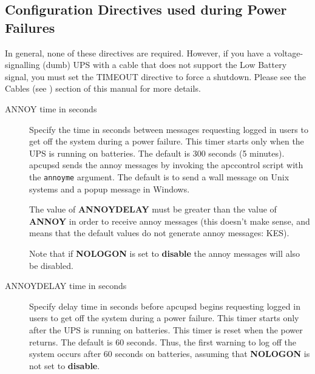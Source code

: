 {{{{{{{{{{{\begin{description}
{{This filename may also be specified at build time by using the {\tt
\verb{--{with-log-dir=} option of the {\tt ./configure} program. 
\end{description}

\label{Configuration-Directives-used-during-Power-Failures}

\subsection*{Configuration Directives used during Power Failures}

\label{index-Directives_002c-Power-fail-243}
\label{index-Power-fail-directives-244}
In general, none of these directives are required. However, if you have a
voltage-signalling (dumb) UPS with a cable that does not support the Low
Battery signal, you must set the TIMEOUT directive to force a shutdown. Please
see the Cables (see 
) section of this manual for more details.  

\begin{description}

\item [ANNOY \lt{}time in seconds\gt{}]
   Specify the time in seconds between messages requesting logged in users to get
off the system during a power failure. This timer starts only when the UPS is
running on batteries. The default is 300 seconds (5 minutes). apcupsd sends
the annoy messages by invoking the apccontrol script with the {\tt annoyme}
argument. The default is to send a wall message on Unix systems and a popup
message in Windows.  

The value of {\bf ANNOYDELAY} must be greater than the value of {\bf ANNOY} in
order to receive annoy messages (this doesn't make sense, and means that the
default values do not generate annoy messages: KES).  

Note that if {\bf NOLOGON} is set to {\bf disable} the annoy messages will
also be disabled.  

\item [ANNOYDELAY \lt{}time in seconds\gt{}]
   Specify delay time in seconds before apcupsd begins requesting logged in users
to get off the system during a power failure. This timer starts only after the
UPS is running on batteries. This timer is reset when the power returns. The
default is 60 seconds. Thus, the first warning to log off the system occurs
after 60 seconds on batteries, assuming that {\bf NOLOGON} is not set to {\bf
disable}.  


\end{description}}}}}}}}}}}}
